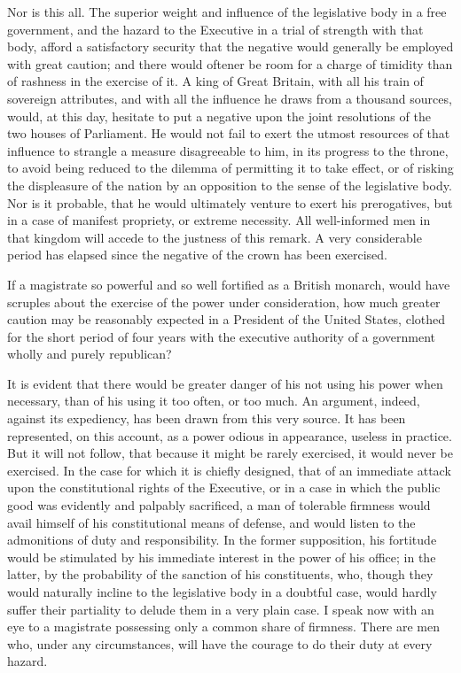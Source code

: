 Nor is this all. The superior weight and influence of the legislative body in a free government, and the hazard to the Executive in a trial of strength with that body, afford a satisfactory security that the negative would generally be employed with great caution; and there would oftener be room for a charge of timidity than of rashness in the exercise of it. A king of Great Britain, with all his train of sovereign attributes, and with all the influence he draws from a thousand sources, would, at this day, hesitate to put a negative upon the joint resolutions of the two houses of Parliament. He would not fail to exert the utmost resources of that influence to strangle a measure disagreeable to him, in its progress to the throne, to avoid being reduced to the dilemma of permitting it to take effect, or of risking the displeasure of the nation by an opposition to the sense of the legislative body. Nor is it probable, that he would ultimately venture to exert his prerogatives, but in a case of manifest propriety, or extreme necessity. All well-informed men in that kingdom will accede to the justness of this remark. A very considerable period has elapsed since the negative of the crown has been exercised.

If a magistrate so powerful and so well fortified as a British monarch, would have scruples about the exercise of the power under consideration, how much greater caution may be reasonably expected in a President of the United States, clothed for the short period of four years with the executive authority of a government wholly and purely republican?

It is evident that there would be greater danger of his not using his power when necessary, than of his using it too often, or too much. An argument, indeed, against its expediency, has been drawn from this very source. It has been represented, on this account, as a power odious in appearance, useless in practice. But it will not follow, that because it might be rarely exercised, it would never be exercised. In the case for which it is chiefly designed, that of an immediate attack upon the constitutional rights of the Executive, or in a case in which the public good was evidently and palpably sacrificed, a man of tolerable firmness would avail himself of his constitutional means of defense, and would listen to the admonitions of duty and responsibility. In the former supposition, his fortitude would be stimulated by his immediate interest in the power of his office; in the latter, by the probability of the sanction of his constituents, who, though they would naturally incline to the legislative body in a doubtful case, would hardly suffer their partiality to delude them in a very plain case. I speak now with an eye to a magistrate possessing only a common share of firmness. There are men who, under any circumstances, will have the courage to do their duty at every hazard.

